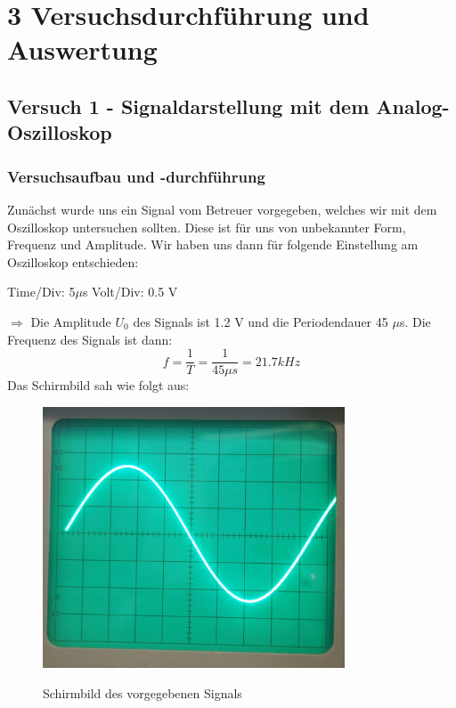\chapter*{3 Versuchsdurchführung und Auswertung}
\setcounter{chapter}{3}
\setcounter{section}{0}
\setcounter{subsection}{0}
\vspace{-2em}
\section{Versuch 1 - Signaldarstellung mit dem Analog-Oszilloskop}
\vspace{-1em}
    \subsection{Versuchsaufbau und -durchführung}
    Zunächst wurde uns ein Signal vom Betreuer vorgegeben, welches wir mit dem Oszilloskop untersuchen sollten. Diese ist für uns von unbekannter Form, Frequenz und Amplitude. Wir haben uns dann für folgende Einstellung am Oszilloskop entschieden:
   
    Time/Div: 5$\mu$s 
    Volt/Div: 0.5 V
   
    $\Rightarrow$ Die Amplitude $U_0$ des Signals ist 1.2 V und die Periodendauer 45 $\mu$s. Die Frequenz des Signals ist dann:
    \vspace{-0.5em}
    \begin{equation}
        f = \frac{1}{T} = \frac{1}{45\mu s} = 21.7 kHz
        \label{eq:Versuch1_Frequenz}
    \end{equation}
    \vspace{-0.5em}
    Das Schirmbild sah wie folgt aus:
    \begin{figure}[H]
        \centering
        \caption{Schirmbild des vorgegebenen Signals}
        \includegraphics[width=0.8\textwidth]{bilder/Versuch_1.png}
        \label{fig:Versuch1_Schirmbild}
    \end{figure}

